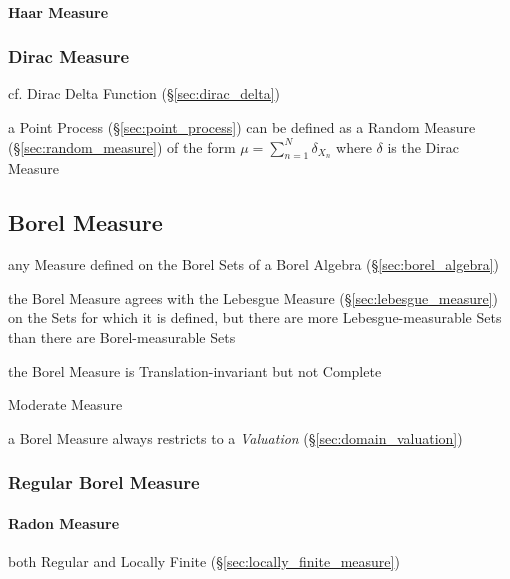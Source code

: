 \paragraph{Haar Measure}\label{sec:haar_measure}\hfill



\subsubsection{Dirac Measure}\label{sec:dirac_measure}

cf. Dirac Delta Function (\S\ref{sec:dirac_delta})

a Point Process (\S\ref{sec:point_process}) can be defined as a Random Measure
(\S\ref{sec:random_measure}) of the form $\mu = \sum_{n=1}^N \delta_{X_n}$ where
$\delta$ is the Dirac Measure



\subsection{Borel Measure}\label{sec:borel_measure}

any Measure defined on the Borel Sets of a Borel Algebra
(\S\ref{sec:borel_algebra})

the Borel Measure agrees with the Lebesgue Measure
(\S\ref{sec:lebesgue_measure}) on the Sets for which it is defined, but there
are more Lebesgue-measurable Sets than there are Borel-measurable Sets

the Borel Measure is Translation-invariant but not Complete

Moderate Measure

\fist a Borel Measure always restricts to a \emph{Valuation}
(\S\ref{sec:domain_valuation})



\subsubsection{Regular Borel Measure}\label{sec:regualr_borel}\hfill

\paragraph{Radon Measure}\label{sec:radon_measure}\hfill

both Regular and Locally Finite (\S\ref{sec:locally_finite_measure})



